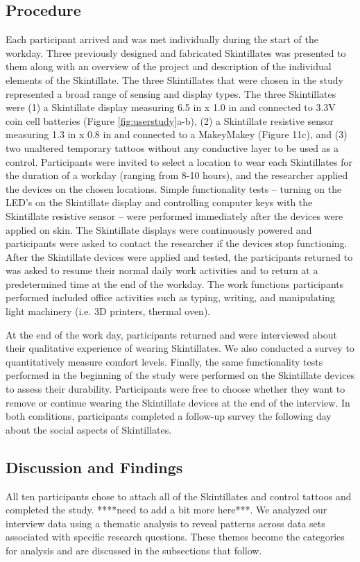 \documentclass{sigchi}
\begin{document}
\subsection {Procedure}
Each participant arrived and was met individually during the start of the workday.  Three previously designed and fabricated Skintillates was presented to them along with an overview of the project and description of the individual elements of the Skintillate.  The three Skintillates that were chosen in the study represented a broad range of sensing and display types.  The three Skintillates were (1) a Skintillate display measuring 6.5 in x 1.0 in and connected to 3.3V coin cell batteries (Figure \ref{fig:userstudy}a-b), (2) a Skintillate resistive sensor measuring 1.3 in x 0.8 in and connected to a MakeyMakey (Figure 11c), and (3) two unaltered temporary tattoos without any conductive layer to be used as a control. Participants were invited to select a location to wear each Skintillates for the duration of a workday (ranging from 8-10 hours), and the researcher applied the devices on the chosen locations. Simple functionality tests – turning on the LED’s on the Skintillate display and controlling computer keys with the Skintillate resistive sensor – were performed immediately after the devices were applied on skin. The Skintillate displays were continuously powered and participants were asked to contact the researcher if the devices stop functioning. After the Skintillate devices were applied and tested, the participants returned to was asked to resume their normal daily work activities and to return at a predetermined time at the end of the workday. The work functions participants performed included office activities such as typing, writing, and manipulating light machinery (i.e. 3D printers, thermal oven).

At the end of the work day, participants returned and were interviewed about their qualitative experience of wearing Skintillates.  We also conducted a survey to  quantitatively measure comfort levels.   Finally, the same  functionality tests performed in the beginning of the study were performed on the Skintillate devices to assess their durability. Participants were free to choose whether they want to remove or continue wearing the Skintillate devices at the end of the interview.    In both conditions, participants completed a follow-up survey the following day about the social aspects of Skintillates.
\subsection {Discussion and Findings}
All ten participants chose to attach all of the Skintillates and control tattoos and completed the study. ****need to add a bit more here***.  We analyzed our interview data using a thematic analysis to reveal patterns across data sets associated with specific research questions. These themes become the categories for analysis and are discussed in the subsections that follow.
\end{document}
